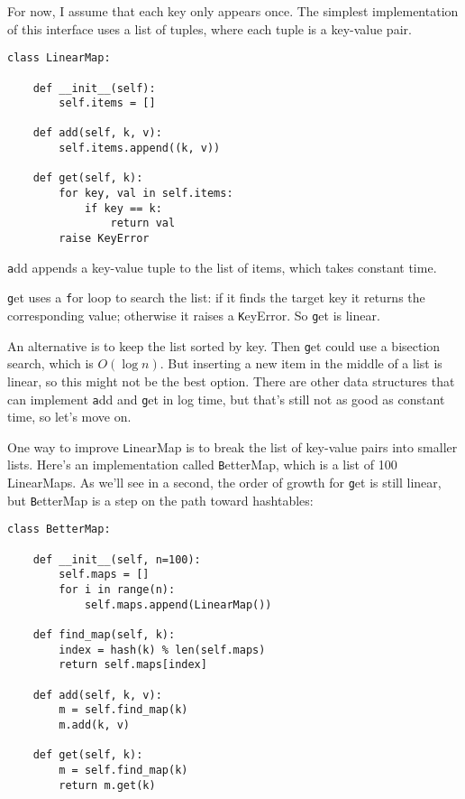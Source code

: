 \documentclass[
DIV=11,
fontsize=13,
twoside,
headinclude=false,
titlepage=firstiscover,
abstract=true,
headsepline=true,
footsepline=true,
chapterprefix=true, %
headings=big,
bibliography=totoc,%
captions=tableheading
]{scrbook}
\theoremstyle{definition}
\begin{document}
For now, I assume that each key only appears once.
The simplest implementation of this interface uses a list of
tuples, where each tuple is a key-value pair.

\begin{lstlisting}
class LinearMap:

    def __init__(self):
        self.items = []

    def add(self, k, v):
        self.items.append((k, v))

    def get(self, k):
        for key, val in self.items:
            if key == k:
                return val
        raise KeyError
\end{lstlisting}

{\texttt add} appends a key-value tuple to the list of items, which
takes constant time.

{\texttt get} uses a {\texttt for} loop to search the list:
if it finds the target key it returns the corresponding value;
otherwise it raises a {\texttt KeyError}.
So {\texttt get} is linear.

An alternative is to keep the list sorted by key.  Then {\texttt get}
could use a bisection search, which is $O(\log n)$.  But inserting a
new item in the middle of a list is linear, so this might not be the
best option.  There are other data structures that can implement {\texttt
  add} and {\texttt get} in log time, but that's still not as good as
constant time, so let's move on.

One way to improve {\texttt LinearMap} is to break the list of key-value
pairs into smaller lists.  Here's an implementation called
{\texttt BetterMap}, which is a list of 100 LinearMaps.  As we'll see
in a second, the order of growth for {\texttt get} is still linear,
but {\texttt BetterMap} is a step on the path toward hashtables:

\begin{lstlisting}
class BetterMap:

    def __init__(self, n=100):
        self.maps = []
        for i in range(n):
            self.maps.append(LinearMap())

    def find_map(self, k):
        index = hash(k) % len(self.maps)
        return self.maps[index]

    def add(self, k, v):
        m = self.find_map(k)
        m.add(k, v)

    def get(self, k):
        m = self.find_map(k)
        return m.get(k)
\end{lstlisting}
\end{document}
